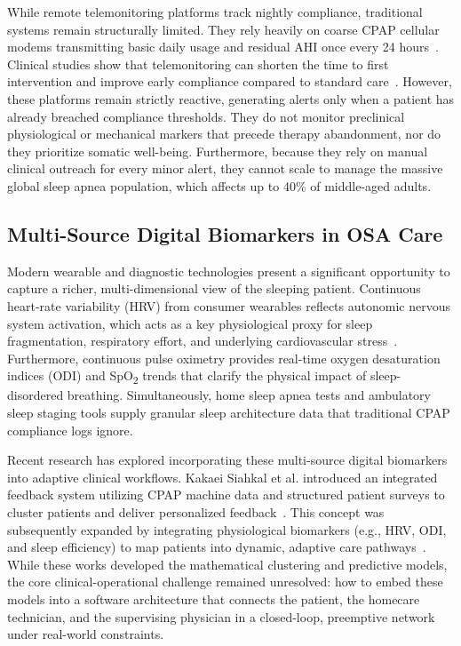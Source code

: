 \documentclass[conference]{IEEEtran}
\begin{document}
While remote telemonitoring platforms track nightly compliance, traditional systems remain structurally limited. They rely heavily on coarse CPAP cellular modems transmitting basic daily usage and residual AHI once every 24 hours~\cite{hoet2017,thong2022}. Clinical studies show that telemonitoring can shorten the time to first intervention and improve early compliance compared to standard care~\cite{hoet2017,lacroix2023}. However, these platforms remain strictly reactive, generating alerts only when a patient has already breached compliance thresholds. They do not monitor preclinical physiological or mechanical markers that precede therapy abandonment, nor do they prioritize somatic well-being. Furthermore, because they rely on manual clinical outreach for every minor alert, they cannot scale to manage the massive global sleep apnea population, which affects up to 40\% of middle-aged adults.

\subsection{Multi-Source Digital Biomarkers in OSA Care}
Modern wearable and diagnostic technologies present a significant opportunity to capture a richer, multi-dimensional view of the sleeping patient. Continuous heart-rate variability (HRV) from consumer wearables reflects autonomic nervous system activation, which acts as a key physiological proxy for sleep fragmentation, respiratory effort, and underlying cardiovascular stress~\cite{kakaei2025cbms}. Furthermore, continuous pulse oximetry provides real-time oxygen desaturation indices (ODI) and SpO\textsubscript{2} trends that clarify the physical impact of sleep-disordered breathing. Simultaneously, home sleep apnea tests and ambulatory sleep staging tools supply granular sleep architecture data that traditional CPAP compliance logs ignore.

Recent research has explored incorporating these multi-source digital biomarkers into adaptive clinical workflows. Kakaei Siahkal et al. introduced an integrated feedback system utilizing CPAP machine data and structured patient surveys to cluster patients and deliver personalized feedback~\cite{kakaei2024bhi}. This concept was subsequently expanded by integrating physiological biomarkers (e.g., HRV, ODI, and sleep efficiency) to map patients into dynamic, adaptive care pathways~\cite{kakaei2025skima,kakaei2025cbms}. While these works developed the mathematical clustering and predictive models, the core clinical-operational challenge remained unresolved: how to embed these models into a software architecture that connects the patient, the homecare technician, and the supervising physician in a closed-loop, preemptive network under real-world constraints.
\end{document}
